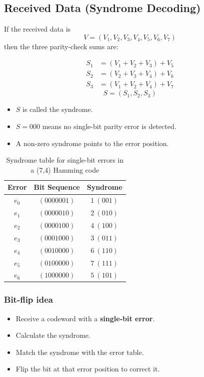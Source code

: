 \documentclass[11pt,a4paper]{book}
\renewcommand{\arraystretch}{1.4}
\newenvironment{formulabox}[1][Formula]{%
    \begin{tcolorbox}[
        enhanced,
        breakable,
        colback=softcoral!10,
        colframe=softcoral!200,
        title=#1,
        fonttitle=\bfseries,
        coltitle=white,
        sharp corners,
        boxrule=1pt,
        left=8pt,
        right=8pt,
        top=6pt,
        bottom=6pt
    ]
}{\end{tcolorbox}}
\begin{document}
\subsection{Received Data (Syndrome Decoding)}

\begin{formulabox}[Syndrome for the 7:4 Systematic Hamming Code]
If the received data is
\[
V=(V_1,V_2,V_3,V_4,V_5,V_6,V_7)
\]
then the three parity-check sums are:

\begin{align*}
S_1 &= (V_1+V_2+V_3)+V_5\\
S_2 &= (V_2+V_3+V_4)+V_6\\
S_3 &= (V_1+V_2+V_4)+V_7
\end{align*}
\[
S=(S_1,S_2,S_3)
\]
\begin{itemize}
    \item \(S\) is called the syndrome.
    \item \(S=000\) means no single-bit parity error is detected.
    \item A non-zero syndrome points to the error position.
\end{itemize}

\begin{table}[H]
\centering
\renewcommand{\arraystretch}{1.15}
\setlength{\tabcolsep}{8pt}
\begin{tabular}{|c|c|c|}
\hline
\textbf{Error} & \textbf{Bit Sequence} & \textbf{Syndrome} \\
\hline
\(e_0\) & \((0000001)\) & \(1\ (001)\) \\
\hline
\(e_1\) & \((0000010)\) & \(2\ (010)\) \\
\hline
\(e_2\) & \((0000100)\) & \(4\ (100)\) \\
\hline
\(e_3\) & \((0001000)\) & \(3\ (011)\) \\
\hline
\(e_4\) & \((0010000)\) & \(6\ (110)\) \\
\hline
\(e_5\) & \((0100000)\) & \(7\ (111)\) \\
\hline
\(e_6\) & \((1000000)\) & \(5\ (101)\) \\
\hline
\end{tabular}
\caption{Syndrome table for single-bit errors in a (7,4) Hamming code}
\label{Syndrome_table_for_single-bit_errors_in_a_(7,4)_Hamming_code}
\end{table}
\end{formulabox}

\subsubsection{Bit-flip idea}
\begin{itemize}
    \item Receive a codeword with a \textbf{single-bit error}.
    \item Calculate the syndrome.
    \item Match the syndrome with the error table.
    \item Flip the bit at that error position to correct it.
\end{itemize}
\end{document}
